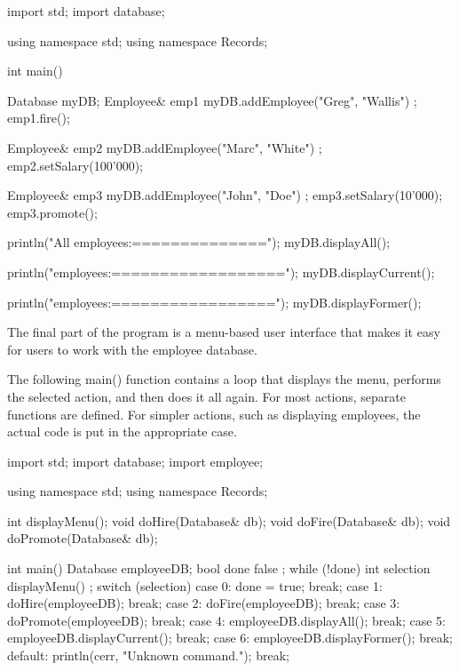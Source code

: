 \begin{cpp}
import std;
import database;

using namespace std;
using namespace Records;

int main()
{
    Database myDB;
    Employee& emp1 { myDB.addEmployee("Greg", "Wallis") };
    emp1.fire();

    Employee& emp2 { myDB.addEmployee("Marc", "White") };
    emp2.setSalary(100'000);

    Employee& emp3 { myDB.addEmployee("John", "Doe") };
    emp3.setSalary(10'000);
    emp3.promote();

    println("All employees:\n==============");
    myDB.displayAll();

    println("\nCurrent employees:\n==================");
    myDB.displayCurrent();

    println("\nFormer employees:\n=================");
    myDB.displayFormer();
}
\end{cpp}


The final part of the program is a menu-based user interface that makes it easy for users to work with the employee database.

The following main() function contains a loop that displays the menu, performs the selected action, and then does it all again. For most actions, separate functions are defined. For simpler actions, such as displaying employees, the actual code is put in the appropriate case.

\begin{cpp}
import std;
import database;
import employee;

using namespace std;
using namespace Records;

int displayMenu();
void doHire(Database& db);
void doFire(Database& db);
void doPromote(Database& db);

int main()
{
    Database employeeDB;
    bool done { false };
    while (!done) {
        int selection { displayMenu() };
        switch (selection) {
        case 0:
            done = true;
            break;
        case 1:
            doHire(employeeDB);
            break;
        case 2:
            doFire(employeeDB);
            break;
        case 3:
            doPromote(employeeDB);
            break;
        case 4:
            employeeDB.displayAll();
            break;
        case 5:
            employeeDB.displayCurrent();
            break;
        case 6:
            employeeDB.displayFormer();
            break;
        default:
            println(cerr, "Unknown command.");
            break;
        }
    }
}
\end{cpp}


